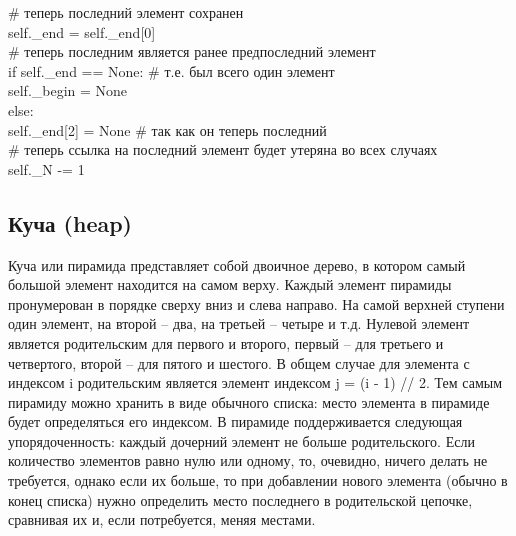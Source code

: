 \documentclass[a4paper, fleqn]{article}
\begin{document}
{\begin{tabbing}
		\> \> \> \# теперь последний элемент сохранен\\
		\> \> self.\_end = self.\_end[0]\\
		\> \> \> \# теперь последним является ранее предпоследний элемент\\
		\> \> if self.\_end == None: \> \> \# т.е. был всего один элемент\\ 
		\> \> \> self.\_begin = None\\
		\> \> else:\\
		\> \> \> self.\_end[2] = None \> \# так как он теперь последний\\
		\> \> \> \# теперь ссылка на последний элемент будет утеряна во всех случаях\\
		\> \> self.\_N -= 1
	\end{tabbing}
}

\subsection*{Куча (heap)}

Куча или пирамида представляет собой двоичное дерево, в котором самый большой элемент находится на самом верху. Каждый элемент пирамиды пронумерован в порядке сверху вниз и слева направо. На самой верхней ступени один элемент, на второй -- два, на третьей -- четыре и т.д. Нулевой элемент является родительским для первого и второго, первый -- для третьего и четвертого, второй -- для пятого и шестого. В общем случае для элемента с индексом i родительским является элемент  индексом j = (i - 1) // 2. Тем самым пирамиду можно хранить в виде обычного списка: место элемента в пирамиде будет определяться его индексом. В пирамиде поддерживается следующая упорядоченность: каждый дочерний элемент не больше родительского. Если количество элементов равно нулю или одному, то, очевидно, ничего делать не требуется, однако если их больше, то при добавлении нового элемента (обычно в конец списка) нужно определить место последнего в родительской цепочке, сравнивая их и, если потребуется, меняя местами. 
\end{document}

